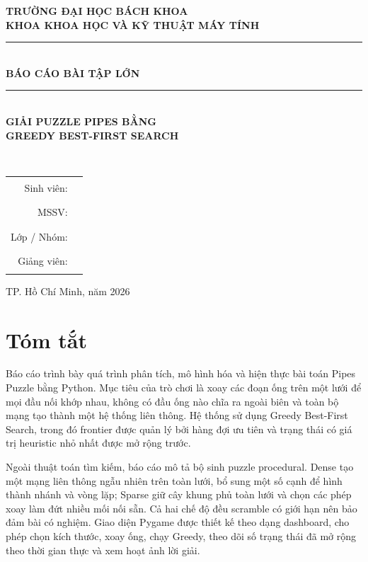 \documentclass[12pt,a4paper]{article}
\begin{document}
\begin{titlepage}
\centering
\vspace*{1.1cm}
{\Large \textbf{TRƯỜNG ĐẠI HỌC BÁCH KHOA}}\\[0.25cm]
{\large \textbf{KHOA KHOA HỌC VÀ KỸ THUẬT MÁY TÍNH}}\\[1.4cm]
{\rule{\textwidth}{1.2pt}}\\[0.35cm]
{\huge \textbf{BÁO CÁO BÀI TẬP LỚN}}\\[0.35cm]
{\rule{\textwidth}{1.2pt}}\\[1.0cm]
{\LARGE \textbf{GIẢI PUZZLE PIPES BẰNG}}\\[0.2cm]
{\LARGE \textbf{GREEDY BEST-FIRST SEARCH}}\\[0.9cm]
\\[1.0cm]
\begin{tabular}{rl}
Sinh viên: & \rule{8cm}{0.4pt}\\[0.5cm]
MSSV: & \rule{8cm}{0.4pt}\\[0.5cm]
Lớp / Nhóm: & \rule{8cm}{0.4pt}\\[0.5cm]
Giảng viên: & \rule{8cm}{0.4pt}
\end{tabular}
\vfill
{\large TP. Hồ Chí Minh, năm 2026}
\end{titlepage}

\section*{Tóm tắt}
Báo cáo trình bày quá trình phân tích, mô hình hóa và hiện thực bài toán Pipes Puzzle bằng Python. Mục tiêu của trò chơi là xoay các đoạn ống trên một lưới để mọi đầu nối khớp nhau, không có đầu ống nào chĩa ra ngoài biên và toàn bộ mạng tạo thành một hệ thống liên thông. Hệ thống sử dụng Greedy Best-First Search, trong đó frontier được quản lý bởi hàng đợi ưu tiên và trạng thái có giá trị heuristic nhỏ nhất được mở rộng trước.

Ngoài thuật toán tìm kiếm, báo cáo mô tả bộ sinh puzzle procedural. Dense tạo một mạng liên thông ngẫu nhiên trên toàn lưới, bổ sung một số cạnh để hình thành nhánh và vòng lặp; Sparse giữ cây khung phủ toàn lưới và chọn các phép xoay làm đứt nhiều mối nối sẵn. Cả hai chế độ đều scramble có giới hạn nên bảo đảm bài có nghiệm. Giao diện Pygame được thiết kế theo dạng dashboard, cho phép chọn kích thước, xoay ống, chạy Greedy, theo dõi số trạng thái đã mở rộng theo thời gian thực và xem hoạt ảnh lời giải.
\end{document}
